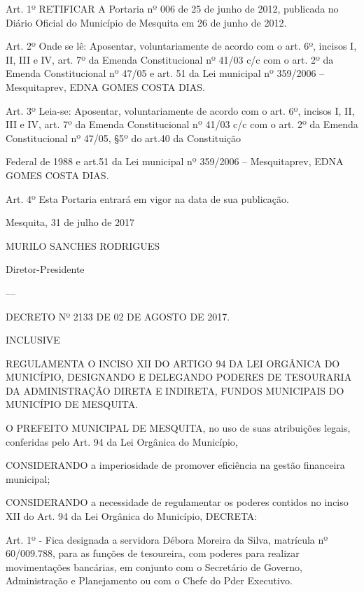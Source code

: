 \documentclass{doliberto}
\begin{document}
Art.  1º  RETIFICAR  A  Portaria  nº  006  de  25  de  junho  de 
2012, publicada no Diário Oficial do Município de Mesquita 
em 26 de junho de 2012. 
 
Art.  2º  Onde  se  lê:  Aposentar,  voluntariamente  de  acordo 
com  o  art.  6º,  incisos  I,  II,  III  e  IV,  art.  7º  da  Emenda 
Constitucional  nº  41/03  c/c  com  o  art.  2º  da  Emenda 
Constitucional  nº  47/05  e  art.  51  da  Lei  municipal  nº 
359/2006 – Mesquitaprev, EDNA GOMES COSTA DIAS. 
 
Art. 3º Leia-se: Aposentar, voluntariamente de acordo com 
o  art.  6º,  incisos  I,  II,  III  e  IV,  art.  7º  da  Emenda 
Constitucional  nº  41/03  c/c  com  o  art.  2º  da  Emenda 
Constitucional  nº  47/05,  §5º  do  art.40  da  Constituição 

Federal  de  1988  e  art.51  da  Lei  municipal  nº  359/2006  – 
Mesquitaprev, EDNA GOMES COSTA DIAS.  
 
Art.  4º  Esta  Portaria  entrará  em  vigor  na  data  de  sua 
publicação.  
 

Mesquita, 31 de julho de 2017 
 

MURILO SANCHES RODRIGUES 

Diretor-Presidente 

---

DECRETO Nº 2133 DE 02 DE AGOSTO DE 2017. 

INCLUSIVE 

REGULAMENTA  O  INCISO  XII  DO  ARTIGO  94  DA  LEI 
ORGÂNICA  DO  MUNICÍPIO,  DESIGNANDO  E  DELEGANDO 
PODERES DE TESOURARIA DA ADMINISTRAÇÃO DIRETA E 
INDIRETA, 
FUNDOS  MUNICIPAIS  DO 
MUNICÍPIO DE MESQUITA. 
 
O  PREFEITO  MUNICIPAL  DE  MESQUITA,  no  uso  de  suas 
atribuições  legais,  conferidas  pelo  Art.  94  da  Lei  Orgânica 
do Município, 
 
CONSIDERANDO  a  imperiosidade  de  promover  eficiência 
na gestão financeira municipal; 
 
CONSIDERANDO a necessidade de regulamentar os poderes 
contidos  no  inciso  XII  do  Art.  94  da  Lei  Orgânica  do 
Município, DECRETA: 
 
Art.  1º  -  Fica  designada  a  servidora  Débora  Moreira  da 
Silva,  matrícula  nº  60/009.788,  para  as  funções  de 
tesoureira,  com  poderes  para  realizar  movimentações 
bancárias,  em  conjunto  com  o  Secretário  de  Governo, 
Administração  e  Planejamento  ou  com  o  Chefe  do  Pder 
Executivo. 
 
\end{document}
